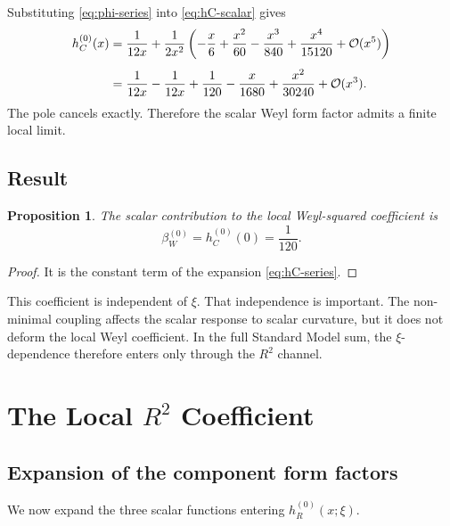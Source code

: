 \documentclass[11pt,a4paper]{article}
\newtheorem{proposition}[theorem]{Proposition}
\theoremstyle{definition}
\theoremstyle{remark}
\begin{document}
Substituting \eqref{eq:phi-series} into \eqref{eq:hC-scalar} gives
\begin{align}
  h_C^{(0)}(x)
  &= \frac{1}{12x}
   + \frac{1}{2x^2}
     \left(
       -\frac{x}{6} + \frac{x^2}{60}
       - \frac{x^3}{840} + \frac{x^4}{15120}
       + \mathcal O(x^5)
     \right)
  \notag\\[4pt]
  &= \frac{1}{12x}
   - \frac{1}{12x}
   + \frac{1}{120}
   - \frac{x}{1680}
   + \frac{x^2}{30240}
   + \mathcal O(x^3).
  \label{eq:hC-series}
\end{align}
The pole cancels exactly.  Therefore the scalar Weyl form factor admits a
finite local limit.

\subsection{Result}

\begin{proposition}
The scalar contribution to the local Weyl-squared coefficient is
\begin{equation}
  \boxed{\beta_W^{(0)} = h_C^{(0)}(0) = \frac{1}{120}.}
  \label{eq:betaW}
\end{equation}
\end{proposition}

\begin{proof}
It is the constant term of the expansion \eqref{eq:hC-series}.
\end{proof}

This coefficient is independent of $\xi$.  That independence is important.
The non-minimal coupling affects the scalar response to scalar curvature, but
it does not deform the local Weyl coefficient.  In the full Standard Model
sum, the $\xi$-dependence therefore enters only through the $R^2$ channel.

\section{The Local \texorpdfstring{$R^2$}{R2} Coefficient}
\label{sec:R2}

\subsection{Expansion of the component form factors}

We now expand the three scalar functions entering $h_R^{(0)}(x;\xi)$.
\end{document}
